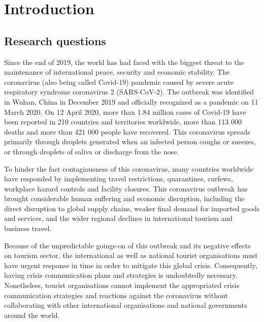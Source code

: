 \documentclass[draft=false
              ,paper=a4
              ,twoside=false
              ,fontsize=12pt
              ,headsepline
              ,BCOR10mm
              ,DIV11
              ]{scrbook}
\begin{document}
\frontmatter



\tableofcontents
\listoffigures
\listoftables
\mainmatter
\chapter{\phantom{o}Introduction}
\vspace{6pt}
\section{Research questions}
\vspace{6pt}
Since the end of 2019, the world has had faced with the biggest threat to the maintenance of international peace, security and economic stability. The coronavirus (also being called Covid-19) pandemic caused by severe acute respiratory syndrome coronavirus 2 (SARS-CoV-2). The outbreak was identified in Wuhan, China in December 2019 and officially recognized as a pandemic on 11 March 2020. On 12 April 2020, more than 1.84 million cases of Covid-19 have been reported in 210 countries and territories worldwide, more than 113 000 deaths and more than 421 000 people have recovered. This coronavirus spreads primarily through droplets generated when an infected person coughs or sneezes, or through droplets of saliva or discharge from the nose. 

To hinder the fast contagiousness of this coronavirus, many countries worldwide have responded by implementing travel restrictions, quarantines, curfews, workplace hazard controls and facility closures. This coronavirus outbreak has brought considerable human suffering and economic disruption, including the direct disruption to global supply chains, weaker final demand for imported goods and services, and the wider regional declines in international tourism and business travel. 

Because of the unpredictable goings-on of this outbreak and its negative effects on tourism sector, the international as well as national tourist organisations must have urgent response in time in order to mitigate this global crisis. Consequently, having crisis communication plans and strategies is undoubtedly necessary. Nonetheless, tourist organisations cannot implement the appropriated crisis communication strategies and reactions against the coronavirus without collaborating with other international organisations and national governments around the world.
\end{document}
